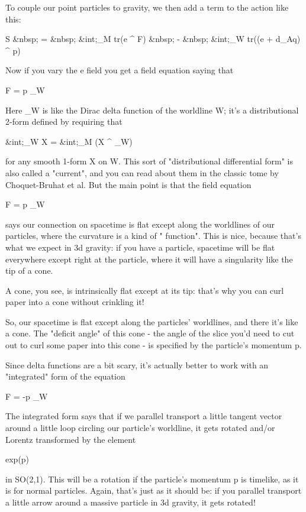 To couple our point particles to gravity, we then add a term to 
the action like this:

S &nbsp; = &nbsp; &int;_{M}  tr(e ^ F) &nbsp; - &nbsp; 
&int;_{W}  tr((e + d_{A}q) ^ p)

Now if you vary the e field you get a field equation saying that 

F = p \delta _{W}

Here \delta _{W} is like the Dirac delta function 
of the worldline W;
it's a distributional 2-form defined by requiring that

&int;_{W}  X   =  &int;_{M}  (X ^ \delta _{W}) 

for any smooth 1-form X on W.  This sort of "distributional
differential form" is also called a "current", and you
can read about them in the classic tome by Choquet-Bruhat et al.  But
the main point is that the field equation

F = p \delta _{W}

says our connection on spacetime is flat except along the worldlines
of our particles, where the curvature is a kind of "\delta 
function".  This is nice, because that's what we expect in 3d
gravity: if you have a particle, spacetime will be flat everywhere
except right at the particle, where it will have a singularity like
the tip of a cone.

A cone, you see, is intrinsically flat except at its tip: that's why 
you can curl paper into a cone without crinkling it!

So, our spacetime is flat except along the particles' worldlines, and
there it's like a cone.  The "deficit angle" of this cone -
the angle of the slice you'd need to cut out to curl some paper into
this cone - is specified by the particle's momentum p.

Since delta functions are a bit scary, it's actually better to work with 
an "integrated" form of the equation

F = -p \delta _{W}

The integrated form says that if we parallel transport a little tangent
vector around a little loop circling our particle's worldline, it gets
rotated and/or Lorentz transformed by the element

exp(p) 

in SO(2,1).  This will be a rotation if the particle's momentum p is 
timelike, as it is for normal particles.   Again, that's just as it 
should be: if you parallel transport a little arrow around a massive 
particle in 3d gravity, it gets rotated!

